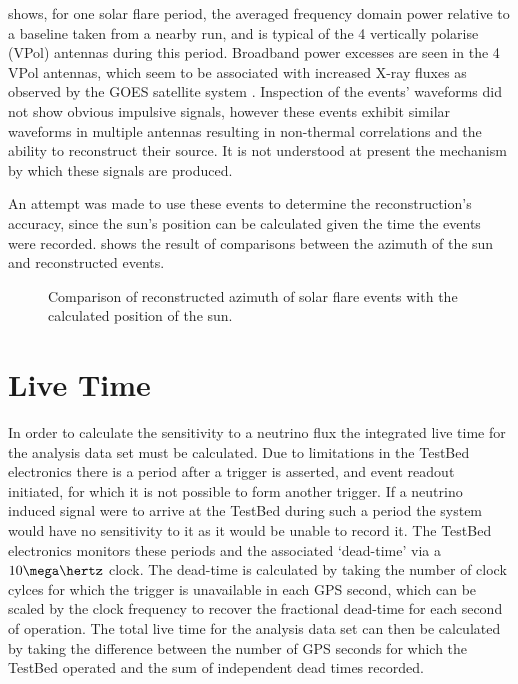  shows, for one solar flare period, the averaged frequency domain power relative to a baseline taken from a nearby run, and is typical of the 4 vertically polarise (VPol) antennas during this period. Broadband power excesses are seen in the 4 VPol antennas, which seem to be associated with increased X-ray fluxes as observed by the GOES satellite system \cite{2009SPIE.7438E...1C}. Inspection of the events' waveforms did not show obvious impulsive signals, however these events exhibit similar waveforms in multiple antennas resulting in non-thermal correlations and the ability to reconstruct their source. It is not understood at present the mechanism by which these signals are produced.

An attempt was made to use these events to determine the reconstruction's accuracy, since the sun's position can be calculated given the time the events were recorded.  shows the result of comparisons between the azimuth of the sun and reconstructed events. 

\begin{figure}
  \hfill
  \caption{Comparison of reconstructed azimuth of solar flare events with the calculated position of the sun.}
  \label{fig:Results:Solar-Flare:Phi}
\end{figure}

\section{Live Time}
\label{sec:Results:Live-Time}

In order to calculate the sensitivity to a neutrino flux the integrated live time for the analysis data set must be calculated. Due to limitations in the TestBed electronics there is a period after a trigger is asserted, and event readout initiated, for which it is not possible to form another trigger. If a neutrino induced signal were to arrive at the TestBed during such a period the system would have no sensitivity to it as it would be unable to record it. The TestBed electronics monitors these periods and the associated `dead-time' via a $10 \mega \hertz$ clock. The dead-time is calculated by taking the number of clock cylces for which the trigger is unavailable in each GPS second, which can be scaled by the clock frequency to recover the fractional dead-time for each second of operation. The total live time for the analysis data set can then be calculated by taking the difference between the number of GPS seconds for which the TestBed operated and the sum of independent dead times recorded. 

